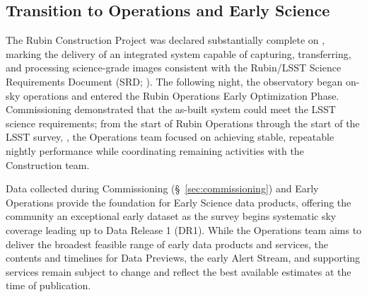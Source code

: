 \subsection{Transition to Operations and Early Science}
\label{ssec:transition}
The Rubin Construction Project was declared substantially complete on \cstrcompdate, marking the delivery of an integrated system capable of capturing, transferring, and processing science-grade images consistent with the Rubin/LSST Science Requirements Document (SRD; \citealt[][]{LPM-17}).
The following night, the observatory began on-sky operations and entered the Rubin Operations Early Optimization Phase.
Commissioning demonstrated that the as-built system could meet the LSST science requirements; from the start of Rubin Operations through the start of the LSST survey, \lsststartdate, the Operations team focused on achieving stable, repeatable nightly performance while coordinating remaining activities with the Construction team.

Data collected during Commissioning (\S~\ref{sec:commissioning}) and Early Operations provide the foundation for Early Science data products, offering the community an exceptional early dataset as the survey begins systematic sky coverage leading up to Data Release 1 (DR1).
While the Operations team aims to deliver the broadest feasible range of early data products and services, the contents and timelines for Data Previews, the early Alert Stream, and supporting services remain subject to change and reflect the best available estimates at the time of publication.


